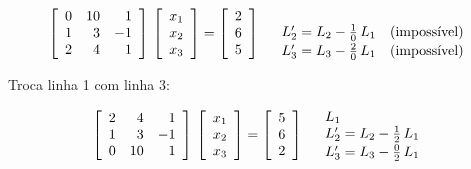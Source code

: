 \begin{example}

\begin{equation}
 \label{cap4:sec2:eq1}
 \left[
 \begin{array}{rrr}
   0 & 10 & 1 \\
   1 & 3 & -1 \\
   2 & 4 & 1
 \end{array}
 \right]
 \,
 \left[
 \begin{array}{r}
   x_1 \\
   x_2 \\
   x_3
 \end{array}
 \right]
 =
 \left[
 \begin{array}{r}
   2 \\
   6 \\
   5
 \end{array}
 \right]
 \quad
 \begin{array}{l}
   \\
   L'_2 = L_2 - \frac{1}{0}\,L_1 \quad \mbox{(impossível)} \vspace*{0.05cm}\\
   L'_3 = L_3 - \frac{2}{0}\,L_1 \quad \mbox{(impossível)}
 \end{array}
\end{equation}

Troca linha 1 com linha 3:

\begin{equation}
 \label{cap4:sec2:eq2}
 \left[
 \begin{array}{rrr}
   2 & 4 & 1 \\
   1 & 3 & -1 \\
   0 & 10 & 1
 \end{array}
 \right]
 \,
 \left[
 \begin{array}{r}
   x_1 \\
   x_2 \\
   x_3
 \end{array}
 \right]
 =
 \left[
 \begin{array}{r}
   5 \\
   6 \\
   2
 \end{array}
 \right]
 \quad
 \begin{array}{l}
   L_1 \\
   L'_2 = L_2 - \frac{1}{2}\,L_1 \vspace*{0.05cm}\\
   L'_3 = L_3 - \frac{0}{2}\,L_1
 \end{array}
\end{equation}


\end{example}
